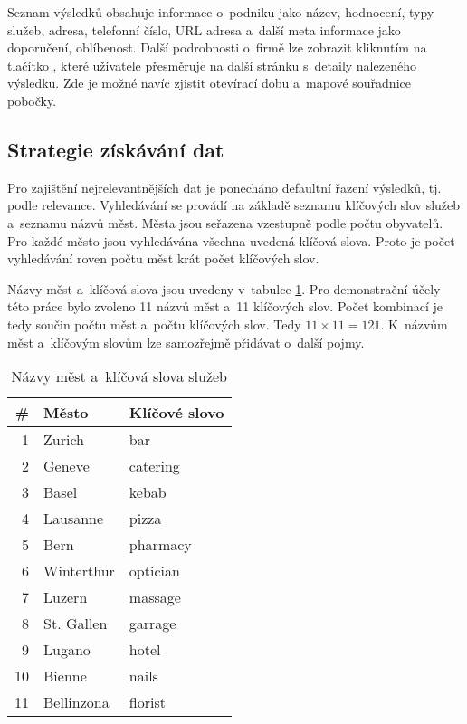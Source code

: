 \documentclass[11pt,a4paper]{article}
\begin{document}
Seznam výsledků obsahuje informace o~podniku jako název, hodnocení, typy služeb, adresa, telefonní číslo, URL adresa a~další meta informace jako doporučení, oblíbenost. Další podrobnosti o~firmě lze zobrazit kliknutím na tlačítko , které uživatele přesměruje na další stránku s~detaily nalezeného výsledku. Zde je možné navíc zjistit otevírací dobu a~mapové souřadnice pobočky.

\subsection{Strategie získávání dat}
Pro zajištění nejrelevantnějších dat je ponecháno defaultní řazení výsledků, tj. podle relevance. Vyhledávání se provádí na základě seznamu klíčových slov služeb a~seznamu názvů měst. Města jsou seřazena vzestupně podle počtu obyvatelů. Pro každé město jsou vyhledávána všechna uvedená klíčová slova. Proto je počet vyhledávání roven počtu měst krát počet klíčových slov. 

Názvy měst a~klíčová slova jsou uvedeny v~tabulce \ref{cityandkeywords}. Pro demonstrační účely této práce bylo zvoleno 11 názvů měst a~11 klíčových slov. Počet kombinací je tedy součin počtu měst a~počtu klíčových slov. Tedy $ 11 \times 11 = 121 $. K~názvům měst a~klíčovým slovům lze samozřejmě přidávat o~další pojmy.

\begin{table}[ht]
\centering
\begin{tabular}{rll}
\textbf{\#} & \textbf{Město} & \textbf{Klíčové slovo}                                        \\
\hline
1  & Zurich                             & bar                                        \\
2  & Geneve                             & catering                                   \\
3  & Basel                              & kebab                                      \\
4  & Lausanne                           & pizza                                      \\
5  & Bern                               & pharmacy                                   \\
6  & Winterthur                         & optician                                   \\
7  & Luzern                             & massage                                    \\
8  & St. Gallen                         & garrage                                    \\
9  & Lugano                             & hotel                                      \\
10 & Bienne                             & nails                                      \\
11 & Bellinzona                         & florist           
\end{tabular}
\caption{Názvy měst a~klíčová slova služeb}
\label{cityandkeywords}
\end{table}
\end{document}
